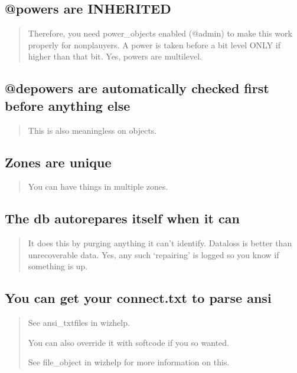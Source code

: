 \documentclass[letterpaper,10pt,english]{sphinxmanual}
\begin{document}
\subsection{@powers are INHERITED}
\label{\detokenize{features:powers-are-inherited}}\begin{quote}

\sphinxAtStartPar
Therefore, you need power\_objects enabled (@admin)
to make this work properly for non\sphinxhyphen{}plauyers.
A power is taken before a bit level ONLY if higher than that bit.
Yes, powers are multi\sphinxhyphen{}level.
\end{quote}


\subsection{@depowers are automatically checked first before anything else}
\label{\detokenize{features:depowers-are-automatically-checked-first-before-anything-else}}\begin{quote}

\sphinxAtStartPar
This is also meaningless on objects.
\end{quote}


\subsection{Zones are unique}
\label{\detokenize{features:zones-are-unique}}\begin{quote}

\sphinxAtStartPar
You can have things in multiple zones.
\end{quote}


\subsection{The db auto\sphinxhyphen{}repares itself when it can}
\label{\detokenize{features:the-db-auto-repares-itself-when-it-can}}\begin{quote}

\sphinxAtStartPar
It does this by purging anything
it can’t identify.  Dataloss is better than unrecoverable data.
Yes, any such ‘repairing’ is logged so you know if something is up.
\end{quote}


\subsection{You can get your connect.txt to parse ansi}
\label{\detokenize{features:you-can-get-your-connect-txt-to-parse-ansi}}\begin{quote}

\sphinxAtStartPar
See ansi\_txtfiles in wizhelp.

\sphinxAtStartPar
You can also override it with softcode if you so wanted.

\sphinxAtStartPar
See file\_object in wizhelp for more information on this.
\end{quote}
\end{document}
